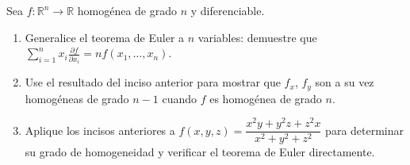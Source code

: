 Sea $f: \mathbb{R}^n \to \mathbb{R}$ homogénea de grado $n$ y diferenciable.
\begin{enumerate}
    \item Generalice el teorema de Euler a $n$ variables: demuestre que $\displaystyle\sum_{i=1}^{n} x_i \frac{\partial f}{\partial x_i} = n f(x_1, \dots, x_n)$.
    \item Use el resultado del inciso anterior para mostrar que $f_x$, $f_y$ son a su vez homogéneas de grado $n - 1$ cuando $f$ es homogénea de grado $n$.
    \item Aplique los incisos anteriores a $f(x, y, z) = \dfrac{x^2 y + y^2 z + z^2 x}{x^2 + y^2 + z^2}$ para determinar su grado de homogeneidad y verificar el teorema de Euler directamente.
\end{enumerate}

